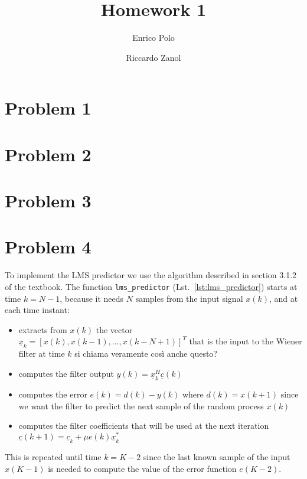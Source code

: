 \documentclass{article}
\author{Enrico Polo \and Riccardo Zanol}
\title{Homework 1}
\newcommand{\inlinecode}[1]{\lstinline[basicstyle=\ttfamily,
    keywordstyle={}]{#1}}
\renewcommand{\vec}[1]{\underline{#1}}
\begin{document}
\maketitle
\section*{Problem 1}
\section*{Problem 2}
\section*{Problem 3}
\section*{Problem 4}
To implement the LMS predictor we use the algorithm described in
section 3.1.2 of the textbook. The function \inlinecode{lms_predictor}
(Lst.~\ref{lst:lms_predictor}) starts at time $k=N-1$, because it
needs $N$ samples from the input signal $x(k)$, and at each
time instant:
\begin{itemize}
  \item extracts from $x(k)$ the vector $\vec{x}_k = [x(k),
    x(k-1),\dots,x(k-N+1)]^T$ that is the input to the Wiener filter
    at time $k$ {\color{red} si chiama veramente così anche questo?}
  \item computes the filter output $y(k) = \vec{x}_k^H\vec{c}(k)$
  \item computes the error $e(k) = d(k) - y(k)$ where $d(k) = x(k+1)$
    since we want the filter to predict the next sample of the random
    process $x(k)$
  \item computes the filter coefficients that will be used at the next
    iteration $\vec{c}(k+1) = \vec{c}_k + \mu e(k) \vec{x}_k^*$
\end{itemize}
This is repeated until time $k = K - 2$ since the last known sample of
the input $x(K-1)$ is needed to compute the value of the error
function $e(K-2)$.
\end{document}
